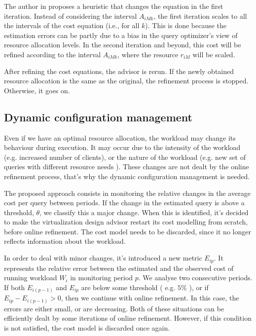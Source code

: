 The author in \cite{Soror:2008:AVM:1376616.1376711} proposes a heuristic that changes the equation in the first iteration. Instead of  considering the interval $A_{iMk}$, the first iteration scales to all the intervals of the cost equation (i.e., for all $k$). This is done because the estimation errors can be partly due to a bias in the query optimizer's view of resource allocation levels. In the second iteration and beyond, this cost will be refined according to the interval $A_{iMk}$, where the resource $r_{iM}$ will be scaled.


After refining the cost equations, the advisor is rerun. If the newly obtained resource allocation is the same as the original, the refinement process is stopped. Otherwise, it goes on.

\subsection{Dynamic configuration management}

Even if we have an optimal resource allocation, the workload may change its behaviour during execution. It may occur due to the intensity of the workload (e.g. increased number of clients), or the nature of the workload (e.g. new set of queries with different resource needs ). These changes are not dealt by the online refinement process, that's why the dynamic configuration management is needed. 

The proposed approach consists in monitoring the relative changes in the average cost per query between periods. If the change in the estimated query is above a threshold, $\theta$, we classify this a major change. When this is identified, it's decided to make the virtualization design advisor restart its cost modelling from scratch, before online refinement. The cost model needs to be discarded, since it no longer reflects information about the workload.

In order to deal with minor changes, it's introduced a new metric $E_{ip}$. It represents the relative error between the estimated and the observed cost of running workload $W_{i}$ in monitoring period $p$. We analyse two consecutive periods. If both $E_{i(p-1)}$ and $E_{ip}$ are below some threshold ( e.g. $5\%$ ), or if $E_{ip} - E_{i(p-1)} > 0$, then we continue with online refinement. In this case, the errors are either small, or are decreasing. Both of these situations can be efficiently dealt by some iterations of online refinement. However, if this condition is not satisfied, the cost model is discarded once again. 